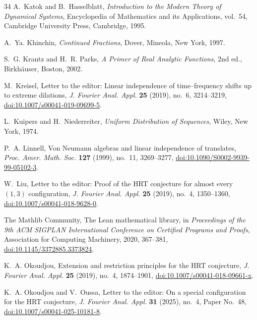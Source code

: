 \documentclass[reqno]{amsart}
\theoremstyle{remark}
\numberwithin{equation}{section}
\begin{document}
\begin{thebibliography}{34}
A.~Katok and B.~Hasselblatt,
\emph{Introduction to the Modern Theory of Dynamical Systems},
Encyclopedia of Mathematics and its Applications, vol.~54,
Cambridge University Press, Cambridge, 1995.

A.~Ya. Khinchin,
\emph{Continued Fractions},
Dover, Mineola, New York, 1997.

S.~G. Krantz and H.~R. Parks,
\emph{A Primer of Real Analytic Functions}, 2nd ed.,
Birkh\"auser, Boston, 2002.

M.~Kreisel,
Letter to the editor: Linear independence of time--frequency shifts up to
extreme dilations,
\emph{J. Fourier Anal. Appl.} \textbf{25} (2019), no.~6, 3214--3219,
\href{https://doi.org/10.1007/s00041-019-09699-5}
{doi:10.1007/s00041-019-09699-5}.

L.~Kuipers and H.~Niederreiter,
\emph{Uniform Distribution of Sequences},
Wiley, New York, 1974.

P.~A. Linnell,
Von Neumann algebras and linear independence of translates,
\emph{Proc. Amer. Math. Soc.} \textbf{127} (1999), no.~11, 3269--3277,
\href{https://doi.org/10.1090/S0002-9939-99-05102-3}
{doi:10.1090/S0002-9939-99-05102-3}.

W.~Liu,
Letter to the editor: Proof of the HRT conjecture for almost every
\((1,3)\) configuration,
\emph{J. Fourier Anal. Appl.} \textbf{25} (2019), no.~4, 1350--1360,
\href{https://doi.org/10.1007/s00041-018-9628-0}
{doi:10.1007/s00041-018-9628-0}.

The Mathlib Community,
The Lean mathematical library,
in \emph{Proceedings of the 9th ACM SIGPLAN International Conference on
Certified Programs and Proofs},
Association for Computing Machinery, 2020, 367--381,
\href{https://doi.org/10.1145/3372885.3373824}
{doi:10.1145/3372885.3373824}.

K.~A. Okoudjou,
Extension and restriction principles for the HRT conjecture,
\emph{J. Fourier Anal. Appl.} \textbf{25} (2019), no.~4, 1874--1901,
\href{https://doi.org/10.1007/s00041-018-09661-x}{doi:10.1007/s00041-018-09661-x}.

K.~A. Okoudjou and V.~Oussa,
Letter to the editor: On a special configuration for the HRT conjecture,
\emph{J. Fourier Anal. Appl.} \textbf{31} (2025), no.~4, Paper No.~48,
\href{https://doi.org/10.1007/s00041-025-10181-8}{doi:10.1007/s00041-025-10181-8}.


\end{thebibliography}
\end{document}
